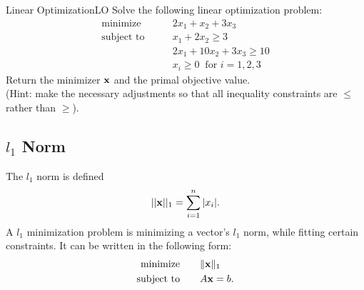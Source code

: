 
%

\begin{problem}{Linear Optimization}{LO}
Solve the following linear optimization problem:
\begin{align*}
\text{minimize}\qquad &2x_1+x_2+3x_3 \\
\text{subject to}\qquad &x_1+2x_2 \geq 3 \\
	        &2x_1+10x_2+3x_3 \geq 10 \\
		&x_i \geq 0  \ \text{ for } i=1,2,3
\end{align*}
Return the minimizer $\mathbf{x}$ and the primal objective value.
\\(Hint: make the necessary adjustments so that all inequality constraints are $\leq$ rather than $\geq$).
\end{problem}

\subsection*{$l_1$ Norm}
The $l_1$ norm is defined 
\[||\mathbf{x}||_1=\sum_{i=1}^n |x_i|.\]
A $l_1$ minimization problem is minimizing a vector's $l_1$ norm, while fitting certain constraints. It can be written in the following form:
\begin{align*}
\mbox{minimize}\qquad &\|\mathbf{x}\|_1\\
\mbox{subject to} \qquad &A\mathbf{x} = b.
\end{align*}

